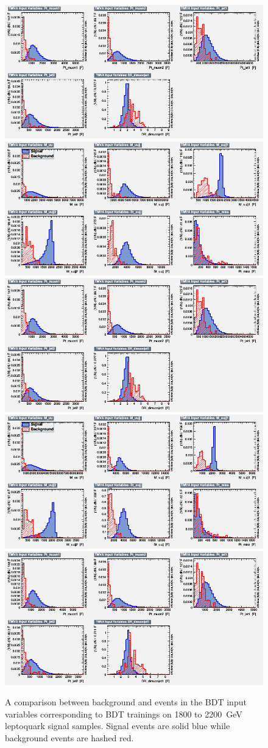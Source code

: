 \begin{figure}[H]
    {\includegraphics[width=.49\textwidth]{Images/Analysis/Results_LQToBMu_pair_uubj_BDTG_FullRun2_2023_01_25_020318/2100/variables_id_c2.png}}
    {\includegraphics[width=.49\textwidth]{Images/Analysis/Results_LQToBMu_pair_uubj_BDTG_FullRun2_2023_01_25_020318/2100/variables_id_c1.png}}
    {\includegraphics[width=.49\textwidth]{Images/Analysis/Results_LQToBMu_pair_uubj_BDTG_FullRun2_2023_01_25_020318/2100/variables_id_c2.png}}
    {\includegraphics[width=.49\textwidth]{Images/Analysis/Results_LQToBMu_pair_uubj_BDTG_FullRun2_2023_01_25_020318/2200/variables_id_c1.png}}
    {\includegraphics[width=.49\textwidth]{Images/Analysis/Results_LQToBMu_pair_uubj_BDTG_FullRun2_2023_01_25_020318/2200/variables_id_c2.png}}
    \caption{A comparison between background and events in the BDT input variables corresponding to BDT trainings on 1800 to \SI{2200}{GeV} leptoquark signal samples. Signal events are solid blue while background events are hashed red.}
    \label{figapp:variables4}
\end{figure}


